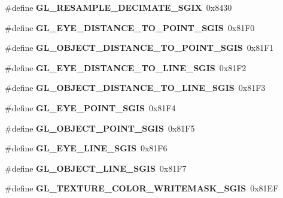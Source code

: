 \begin{DoxyCompactItemize}
\item 
\#define {\bfseries G\+L\+\_\+\+R\+E\+S\+A\+M\+P\+L\+E\+\_\+\+D\+E\+C\+I\+M\+A\+T\+E\+\_\+\+S\+G\+I\+X}~0x8430\label{_s_d_l__opengl_8h_aa966b3a339ec645bcb7f118f2ba7ce2c}

\item 
\#define {\bfseries G\+L\+\_\+\+E\+Y\+E\+\_\+\+D\+I\+S\+T\+A\+N\+C\+E\+\_\+\+T\+O\+\_\+\+P\+O\+I\+N\+T\+\_\+\+S\+G\+I\+S}~0x81\+F0\label{_s_d_l__opengl_8h_a8c81f466ea7fb0cc47a1e897f473ff66}

\item 
\#define {\bfseries G\+L\+\_\+\+O\+B\+J\+E\+C\+T\+\_\+\+D\+I\+S\+T\+A\+N\+C\+E\+\_\+\+T\+O\+\_\+\+P\+O\+I\+N\+T\+\_\+\+S\+G\+I\+S}~0x81\+F1\label{_s_d_l__opengl_8h_a94e12606c202e7a9968abf180b7a5926}

\item 
\#define {\bfseries G\+L\+\_\+\+E\+Y\+E\+\_\+\+D\+I\+S\+T\+A\+N\+C\+E\+\_\+\+T\+O\+\_\+\+L\+I\+N\+E\+\_\+\+S\+G\+I\+S}~0x81\+F2\label{_s_d_l__opengl_8h_a9e033132bd5129f5f97b071f4e12633a}

\item 
\#define {\bfseries G\+L\+\_\+\+O\+B\+J\+E\+C\+T\+\_\+\+D\+I\+S\+T\+A\+N\+C\+E\+\_\+\+T\+O\+\_\+\+L\+I\+N\+E\+\_\+\+S\+G\+I\+S}~0x81\+F3\label{_s_d_l__opengl_8h_a2fdd87fe455b0c5fe91bb8b173d9d2c4}

\item 
\#define {\bfseries G\+L\+\_\+\+E\+Y\+E\+\_\+\+P\+O\+I\+N\+T\+\_\+\+S\+G\+I\+S}~0x81\+F4\label{_s_d_l__opengl_8h_a7809b264de94f9ea7b9fa83ae456f5a7}

\item 
\#define {\bfseries G\+L\+\_\+\+O\+B\+J\+E\+C\+T\+\_\+\+P\+O\+I\+N\+T\+\_\+\+S\+G\+I\+S}~0x81\+F5\label{_s_d_l__opengl_8h_a74e16f57908a5be55d3f99c55bd1bffe}

\item 
\#define {\bfseries G\+L\+\_\+\+E\+Y\+E\+\_\+\+L\+I\+N\+E\+\_\+\+S\+G\+I\+S}~0x81\+F6\label{_s_d_l__opengl_8h_a209293384e2d8d7a238d88fe177dac13}

\item 
\#define {\bfseries G\+L\+\_\+\+O\+B\+J\+E\+C\+T\+\_\+\+L\+I\+N\+E\+\_\+\+S\+G\+I\+S}~0x81\+F7\label{_s_d_l__opengl_8h_ab60a2a4bb8cbc99038fe60a55d7e3a0f}

\item 
\#define {\bfseries G\+L\+\_\+\+T\+E\+X\+T\+U\+R\+E\+\_\+\+C\+O\+L\+O\+R\+\_\+\+W\+R\+I\+T\+E\+M\+A\+S\+K\+\_\+\+S\+G\+I\+S}~0x81\+E\+F\label{_s_d_l__opengl_8h_a7c27686eec31c991a6ffd1bf4edd1534}


\end{DoxyCompactItemize}

